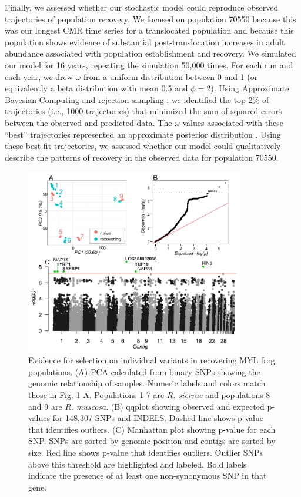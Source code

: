 \documentclass[9pt,twoside,lineno]{pnas-new}
\begin{document}
Finally, we assessed whether our stochastic model could reproduce
observed trajectories of population recovery. We focused on population
70550 because this was our longest CMR time series for a translocated
population and because this population shows evidence of substantial
post-translocation increases in adult abundance associated with
population establishment and recovery. We simulated our model for 16
years, repeating the simulation 50,000 times. For each run and each
year, we drew \(\omega\) from a uniform distribution between 0 and 1 (or
equivalently a beta distribution with mean 0.5 and \(\phi = 2\)). Using
Approximate Bayesian Computing and rejection sampling
\citep{kosmala2016}, we identified the top 2\% of trajectories (i.e.,
1000 trajectories) that minimized the sum of squared errors between the
observed and predicted data. The \(\omega\) values associated with these
``best'' trajectories represented an approximate posterior distribution
\citep{beaumont2010}. Using these best fit trajectories, we assessed
whether our model could qualitatively describe the patterns of recovery
in the observed data for population 70550.

\newpage

\begin{figure}

{\centering \includegraphics[width=0.85\textwidth]{figures/pca_qq_manhattan.png}

}

\caption{\label{fig-selectionresults}Evidence for selection on
individual variants in recovering MYL frog populations. (A) PCA
calculated from binary SNPs showing the genomic relationship of samples.
Numeric labels and colors match those in
Fig. 1 A. Populations 1-7 are \emph{R.
sierrae} and populations 8 and 9 are \emph{R. muscosa}. (B) qqplot
showing observed and expected p-values for 148,307 SNPs and INDELS.
Dashed line shows p-value that identifies outliers. (C) Manhattan plot
showing p-value for each SNP. SNPs are sorted by genomic position and
contigs are sorted by size. Red line shows p-value that identifies
outliers. Outlier SNPs above this threshold are highlighted and labeled.
Bold labels indicate the presence of at least one non-synonymous SNP in
that gene.}

\end{figure}\clearpage
\end{document}
